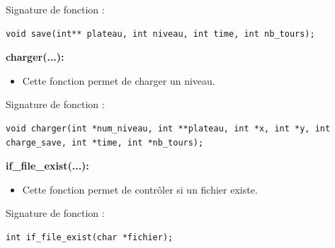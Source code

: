 \documentclass[12pt,french]{article}
\begin{document}
Signature de fonction :
\begin{lstlisting}
void save(int** plateau, int niveau, int time, int nb_tours);
\end{lstlisting}

\textbf{charger(...):}
\begin{itemize}
\item Cette fonction permet de charger un niveau.
\end{itemize}

Signature de fonction :
\begin{lstlisting}
void charger(int *num_niveau, int **plateau, int *x, int *y, int charge_save, int *time, int *nb_tours);
\end{lstlisting}

\textbf{if\_file\_exist(...):}
\begin{itemize}
\item Cette fonction permet de contrôler si un fichier existe.
\end{itemize}

Signature de fonction :
\begin{lstlisting}
int if_file_exist(char *fichier);
\end{lstlisting}
\newpage
\end{document}
